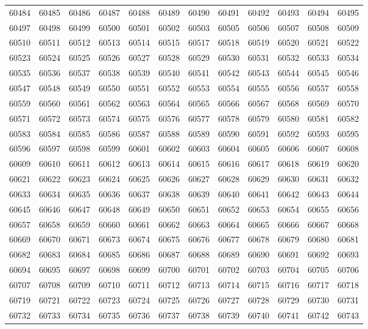 \begin{center}
\begin{longtable}{llllllllllll}
60484 &60485 &60486 &60487 &60488 &60489 &60490 &60491 &60492 &60493 &60494 &60495 \\
60497 &60498 &60499 &60500 &60501 &60502 &60503 &60505 &60506 &60507 &60508 &60509 \\
60510 &60511 &60512 &60513 &60514 &60515 &60517 &60518 &60519 &60520 &60521 &60522 \\
60523 &60524 &60525 &60526 &60527 &60528 &60529 &60530 &60531 &60532 &60533 &60534 \\
60535 &60536 &60537 &60538 &60539 &60540 &60541 &60542 &60543 &60544 &60545 &60546 \\
60547 &60548 &60549 &60550 &60551 &60552 &60553 &60554 &60555 &60556 &60557 &60558 \\
60559 &60560 &60561 &60562 &60563 &60564 &60565 &60566 &60567 &60568 &60569 &60570 \\
60571 &60572 &60573 &60574 &60575 &60576 &60577 &60578 &60579 &60580 &60581 &60582 \\
60583 &60584 &60585 &60586 &60587 &60588 &60589 &60590 &60591 &60592 &60593 &60595 \\
60596 &60597 &60598 &60599 &60601 &60602 &60603 &60604 &60605 &60606 &60607 &60608 \\
60609 &60610 &60611 &60612 &60613 &60614 &60615 &60616 &60617 &60618 &60619 &60620 \\
60621 &60622 &60623 &60624 &60625 &60626 &60627 &60628 &60629 &60630 &60631 &60632 \\
60633 &60634 &60635 &60636 &60637 &60638 &60639 &60640 &60641 &60642 &60643 &60644 \\
60645 &60646 &60647 &60648 &60649 &60650 &60651 &60652 &60653 &60654 &60655 &60656 \\
60657 &60658 &60659 &60660 &60661 &60662 &60663 &60664 &60665 &60666 &60667 &60668 \\
60669 &60670 &60671 &60673 &60674 &60675 &60676 &60677 &60678 &60679 &60680 &60681 \\
60682 &60683 &60684 &60685 &60686 &60687 &60688 &60689 &60690 &60691 &60692 &60693 \\
60694 &60695 &60697 &60698 &60699 &60700 &60701 &60702 &60703 &60704 &60705 &60706 \\
60707 &60708 &60709 &60710 &60711 &60712 &60713 &60714 &60715 &60716 &60717 &60718 \\
60719 &60721 &60722 &60723 &60724 &60725 &60726 &60727 &60728 &60729 &60730 &60731 \\
60732 &60733 &60734 &60735 &60736 &60737 &60738 &60739 &60740 &60741 &60742 &60743 \\

\end{longtable}
\end{center}
